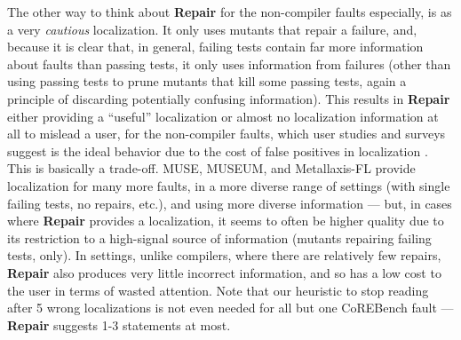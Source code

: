 The other way to think about {\bf Repair} for the non-compiler faults especially, is as a very \emph{cautious} localization.  It only uses mutants that repair a failure, and, because it is clear that, in general, failing tests contain far more information about faults than passing tests, it only uses information from failures (other than using passing tests to prune mutants that kill some passing tests, again a principle of discarding potentially confusing information).  This results in {\bf Repair} either providing a ``useful'' localization or almost no localization information at all to mislead a user, for the non-compiler faults, which user studies and surveys suggest is the ideal behavior due to the cost of false positives in localization \cite{AutoHelp,Kochhar}.  This is basically a trade-off.  MUSE, MUSEUM, and Metallaxis-FL provide localization for many more faults, in a more diverse range of settings (with single failing tests, no repairs, etc.), and using more diverse information --- but, in cases where {\bf Repair} provides a localization, it seems to often be higher quality due to its restriction to a high-signal source of information (mutants repairing failing tests, only).  In settings, unlike compilers, where there are relatively few repairs, {\bf Repair} also produces very little incorrect information, and so has a low cost to the user in terms of wasted attention.  Note that our heuristic to stop reading after 5 wrong localizations is not even needed for all but one CoREBench fault --- {\bf Repair} suggests 1-3 statements at most.

